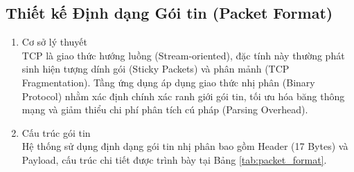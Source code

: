 \subsection[Thiết kế Định dạng Gói tin]{Thiết kế Định dạng Gói tin (Packet Format)}

\begin{enumerate}
    \item Cơ sở lý thuyết \\
    TCP là giao thức hướng luồng (Stream-oriented), đặc tính này thường phát sinh hiện tượng dính gói (Sticky Packets) và phân mảnh (TCP Fragmentation). Tầng ứng dụng áp dụng giao thức nhị phân (Binary Protocol) nhằm xác định chính xác ranh giới gói tin, tối ưu hóa băng thông mạng và giảm thiểu chi phí phân tích cú pháp (Parsing Overhead).

    \item Cấu trúc gói tin \\
    Hệ thống sử dụng định dạng gói tin nhị phân bao gồm Header (17 Bytes) và Payload, cấu trúc chi tiết được trình bày tại Bảng \ref{tab:packet_format}.
\end{enumerate}


